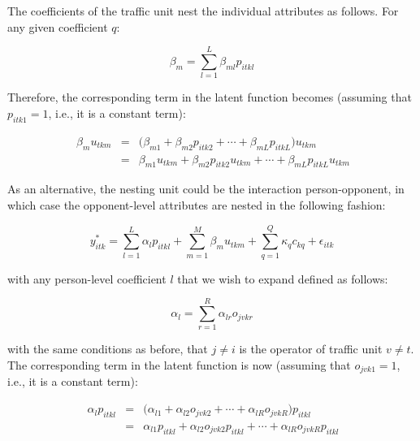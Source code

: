 \documentclass[]{elsarticle} %
\begin{document}
The coefficients of the traffic unit nest the individual attributes as
follows. For any given coefficient \(q\):

\begin{equation}
\label{eq:hierarchical-traffic-unit-coefficients}
\beta_{m}=\sum_{l=1}^L\beta_{ml}p_{itkl} 
\end{equation}

Therefore, the corresponding term in the latent function becomes
(assuming that \(p_{itk1} = 1\), i.e., it is a constant term):

\begin{equation}
\label{eq:hierarchical-traffic-unit-coefficients}
\begin{array}{rcl}\
\beta_{m}u_{tkm} &=& \big( \beta_{m1} + \beta_{m2}p_{itk2} + \cdots + \beta_{mL}p_{itkL}\big)u_{tkm}\\ 
&=& \beta_{m1}u_{tkm} + \beta_{m2}p_{itk2}u_{tkm} + \cdots + \beta_{mL}p_{itkL}u_{tkm}
\end{array}
\end{equation}

As an alternative, the nesting unit could be the interaction
person-opponent, in which case the opponent-level attributes are nested
in the following fashion:

\begin{equation}
\label{eq:latent-function-with-opponent-variables}
y_{itk}^*=\sum_{l=1}^L\alpha_lp_{itkl} + \sum_{m=1}^M\beta_mu_{tkm} + \sum_{q=1}^Q\kappa_qc_{kq} + \epsilon_{itk}
\end{equation}

\noindent with any person-level coefficient \(l\) that we wish to expand
defined as follows:

\begin{equation}
\label{eq:hierarchical-traffic-unit-coefficients}
\alpha_{l}=\sum_{r=1}^R\alpha_{lr}o_{jvkr}
\end{equation}

\noindent with the same conditions as before, that \(j\ne i\) is the
operator of traffic unit \(v\ne t\). The corresponding term in the
latent function is now (assuming that \(o_{jvk1}=1\), i.e., it is a
constant term):

\begin{equation}
\label{eq:hierarchical-traffic-unit-coefficients}
\begin{array}{rcl}\
\alpha_{l}p_{itkl} &=& \big(\alpha_{l1} + \alpha_{l2}o_{jvk2} + \cdots + \alpha_{lR}o_{jvkR} \big)p_{itkl}\\
&=& \alpha_{l1}p_{itkl} + \alpha_{l2}o_{jvk2}p_{itkl} + \cdots + \alpha_{lR}o_{jvkR}p_{itkl}
\end{array} 
\end{equation}
\end{document}
